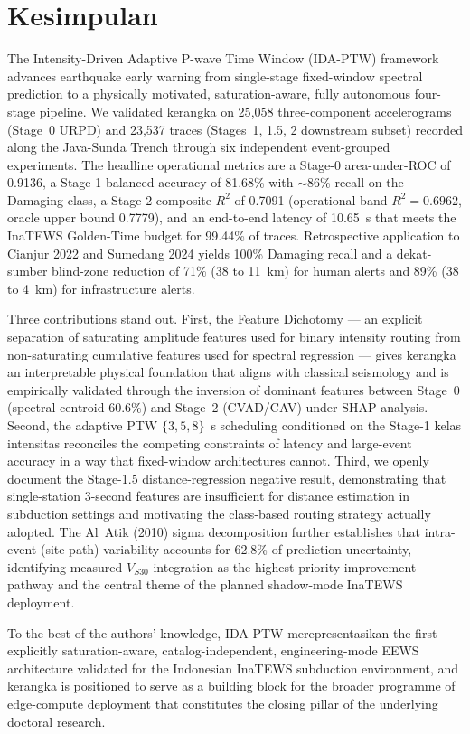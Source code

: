 \documentclass[10pt]{article}
\begin{document}
\section{Kesimpulan}

The Intensity-Driven Adaptive P-wave Time Window (IDA-PTW) framework advances earthquake early warning from single-stage fixed-window spectral prediction to a physically motivated, saturation-aware, fully autonomous four-stage pipeline. We validated kerangka on 25{,}058 three-component accelerograms (Stage~0 URPD) and 23{,}537 traces (Stages~1, 1.5, 2 downstream subset) recorded along the Java-Sunda Trench through six independent event-grouped experiments. The headline operational metrics are a Stage-0 area-under-ROC of 0.9136, a Stage-1 balanced accuracy of 81.68\% with $\sim$86\% recall on the Damaging class, a Stage-2 composite $R^2$ of 0.7091 (operational-band $R^2 = 0.6962$, oracle upper bound 0.7779), and an end-to-end latency of 10.65~s that meets the InaTEWS Golden-Time budget for 99.44\% of traces. Retrospective application to Cianjur 2022 and Sumedang 2024 yields 100\% Damaging recall and a dekat-sumber blind-zone reduction of 71\% (38 to 11~km) for human alerts and 89\% (38 to 4~km) for infrastructure alerts.

Three contributions stand out. First, the Feature Dichotomy --- an explicit separation of saturating amplitude features used for binary intensity routing from non-saturating cumulative features used for spectral regression --- gives kerangka an interpretable physical foundation that aligns with classical seismology and is empirically validated through the inversion of dominant features between Stage~0 (spectral centroid 60.6\%) and Stage~2 (CVAD/CAV) under SHAP analysis. Second, the adaptive PTW $\{3, 5, 8\}$~s scheduling conditioned on the Stage-1 kelas intensitas reconciles the competing constraints of latency and large-event accuracy in a way that fixed-window architectures cannot. Third, we openly document the Stage-1.5 distance-regression negative result, demonstrating that single-station 3-second features are insufficient for distance estimation in subduction settings and motivating the class-based routing strategy actually adopted. The Al~Atik (2010) sigma decomposition further establishes that intra-event (site-path) variability accounts for 62.8\% of prediction uncertainty, identifying measured $V_{S30}$ integration as the highest-priority improvement pathway and the central theme of the planned shadow-mode InaTEWS deployment.

To the best of the authors' knowledge, IDA-PTW merepresentasikan the first explicitly saturation-aware, catalog-independent, engineering-mode EEWS architecture validated for the Indonesian InaTEWS subduction environment, and kerangka is positioned to serve as a building block for the broader programme of edge-compute deployment that constitutes the closing pillar of the underlying doctoral research.
\end{document}
